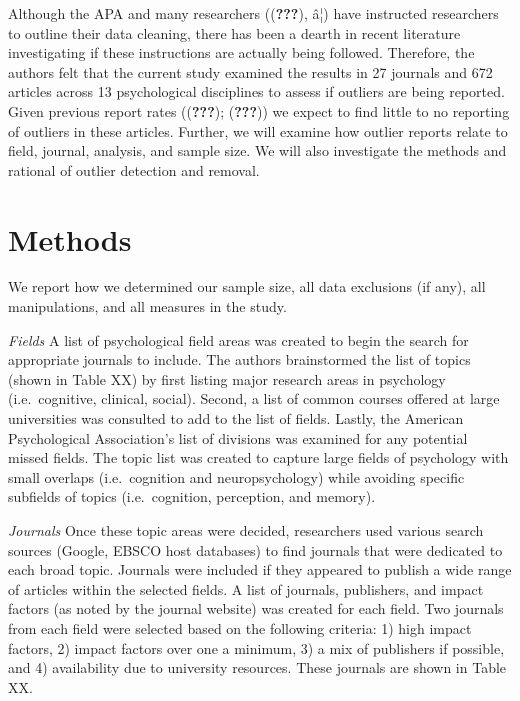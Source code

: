 \documentclass[english,man]{apa6}
\newcounter{author}
\theoremstyle{definition}
\theoremstyle{definition}
\theoremstyle{definition}
\theoremstyle{remark}
\begin{document}
Although the APA and many researchers (({\textbf{???}}), â¦) have
instructed researchers to outline their data cleaning, there has been a
dearth in recent literature investigating if these instructions are
actually being followed. Therefore, the authors felt that the current
study examined the results in 27 journals and 672 articles across 13
psychological disciplines to assess if outliers are being reported.
Given previous report rates (({\textbf{???}}); ({\textbf{???}})) we
expect to find little to no reporting of outliers in these articles.
Further, we will examine how outlier reports relate to field, journal,
analysis, and sample size. We will also investigate the methods and
rational of outlier detection and removal.

\section{Methods}\label{methods}

We report how we determined our sample size, all data exclusions (if
any), all manipulations, and all measures in the study.

\emph{Fields} A list of psychological field areas was created to begin
the search for appropriate journals to include. The authors brainstormed
the list of topics (shown in Table XX) by first listing major research
areas in psychology (i.e.~cognitive, clinical, social). Second, a list
of common courses offered at large universities was consulted to add to
the list of fields. Lastly, the American Psychological Association's
list of divisions was examined for any potential missed fields. The
topic list was created to capture large fields of psychology with small
overlaps (i.e.~cognition and neuropsychology) while avoiding specific
subfields of topics (i.e.~cognition, perception, and memory).

\emph{Journals} Once these topic areas were decided, researchers used
various search sources (Google, EBSCO host databases) to find journals
that were dedicated to each broad topic. Journals were included if they
appeared to publish a wide range of articles within the selected fields.
A list of journals, publishers, and impact factors (as noted by the
journal website) was created for each field. Two journals from each
field were selected based on the following criteria: 1) high impact
factors, 2) impact factors over one a minimum, 3) a mix of publishers if
possible, and 4) availability due to university resources. These
journals are shown in Table XX.
\end{document}
